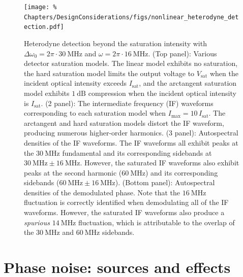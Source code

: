 \begin{figure}
  \centering
  \texttt{[image: \%
    Chapters/DesignConsiderations/figs/nonlinear\_heterodyne\_detection.pdf]}
  \caption[Heterodyne detection beyond the saturation intensity]{%
    Heterodyne detection beyond the saturation intensity with
    $\Delta\omega_0 = 2\pi \cdot \SI{30}{\mega\hertz}$ and
    $\omega = 2 \pi \cdot \SI{16}{\mega\hertz}$.
    (Top panel): Various detector saturation models.
    The linear model exhibits no saturation,
    the hard saturation model limits the output voltage
    to $V_{\text{sat}}$ when the incident optical intensity
    exceeds $I_{\text{sat}}$, and
    the arctangent saturation model exhibits $\SI{1}{\deci\bel}$ compression
    when the incident optical intensity is $I_{\text{sat}}$.
    (2 panel): The intermediate frequency (IF) waveforms
    corresponding to each saturation model when
    $I_{\text{max}} = 10 \, I_{\text{sat}}$.
    The arctangent and hard saturation models distort the IF waveform,
    producing numerous higher-order harmonics.
    (3 panel): Autospectral densities of the IF waveforms.
    The IF waveforms all exhibit peaks at
    the $\SI{30}{\mega\hertz}$ fundamental and
    its corresponding sidebands at
    $\SI{30}{\mega\hertz} \pm \SI{16}{\mega\hertz}$.
    However, the saturated IF waveforms
    also exhibit peaks at the second harmonic ($\SI{60}{\mega\hertz}$)
    and its corresponding sidebands
    ($\SI{60}{\mega\hertz} \pm \SI{16}{\mega\hertz}$).
    (Bottom panel): Autospectral densities of the demodulated phase.
    Note that the $\SI{16}{\mega\hertz}$ fluctuation is correctly identified
    when demodulating all of the IF waveforms.
    However, the saturated IF waveforms also produce
    a \emph{spurious} $\SI{14}{\mega\hertz}$ fluctuation,
    which is attributable to the overlap of
    the $\SI{30}{\mega\hertz}$ and $\SI{60}{\mega\hertz}$ sidebands.
  }
\label{fig:DesignConsiderations:nonlinear_heterodyne_detection}
\end{figure}


\section{Phase noise: sources and effects}
\label{sec:DesignConsiderations:phase_noise}


